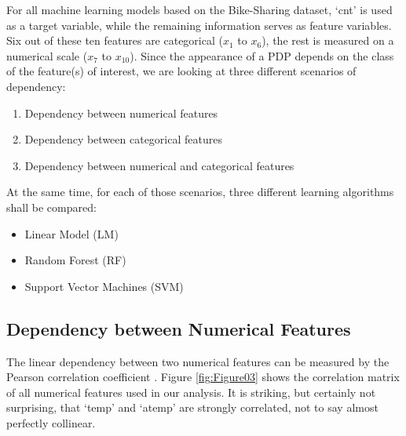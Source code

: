\documentclass[]{krantz}
\providecommand{\tightlist}{%
  \setlength{\itemsep}{0pt}\setlength{\parskip}{0pt}}
\begin{document}
For all machine learning models based on the Bike-Sharing dataset, `cnt'
is used as a target variable, while the remaining information serves as
feature variables. Six out of these ten features are categorical
(\(x_1\) to \(x_6\)), the rest is measured on a numerical scale (\(x_7\)
to \(x_{10}\)). Since the appearance of a PDP depends on the class of
the feature(s) of interest, we are looking at three different scenarios
of dependency:

\begin{enumerate}
\def\labelenumi{\arabic{enumi}.}
\tightlist
\item
  Dependency between numerical features
\item
  Dependency between categorical features
\item
  Dependency between numerical and categorical features
\end{enumerate}

At the same time, for each of those scenarios, three different learning
algorithms shall be compared:

\begin{itemize}
\tightlist
\item
  Linear Model (LM)
\item
  Random Forest (RF)
\item
  Support Vector Machines (SVM)
\end{itemize}

\subsection{Dependency between Numerical
Features}\label{dependency-between-numerical-features}

The linear dependency between two numerical features can be measured by
the Pearson correlation coefficient \citep{fahrmeir2016statistik}.
Figure \ref{fig:Figure03} shows the correlation matrix of all numerical
features used in our analysis. It is striking, but certainly not
surprising, that `temp' and `atemp' are strongly correlated, not to say
almost perfectly collinear.
\end{document}
